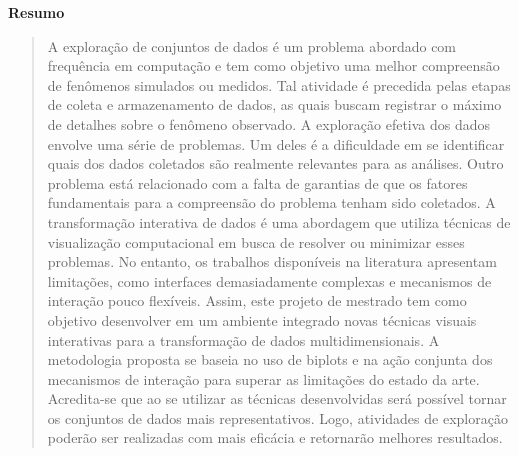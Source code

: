 \begin{center}
  \textbf{Resumo}
\end{center}

\begin{quotation}
\noindent
%
A exploração de conjuntos de dados é um problema abordado
com frequência em computação e tem como objetivo uma melhor
compreensão de fenômenos simulados ou medidos.
%
Tal atividade é precedida pelas etapas de coleta e
armazenamento de dados, as quais buscam registrar o máximo
de detalhes sobre o fenômeno observado.
%
A exploração efetiva dos dados envolve uma série de
problemas. 
%
Um deles é a dificuldade em se identificar quais
dos dados coletados são realmente relevantes para as
análises. 
%
Outro problema está relacionado com a falta de
garantias de que os fatores fundamentais para a compreensão
do problema tenham sido coletados.
% 
A transformação interativa de dados é uma abordagem que
utiliza técnicas de visualização computacional em busca de
resolver ou minimizar esses problemas. 
%
No entanto, os trabalhos disponíveis na literatura
apresentam limitações, como interfaces demasiadamente
complexas e mecanismos de interação pouco flexíveis. 
%
Assim, este projeto de mestrado tem como objetivo
desenvolver em um ambiente integrado novas técnicas visuais
interativas para a transformação de dados multidimensionais.
%
A metodologia proposta se baseia no uso de biplots e na
ação conjunta dos mecanismos de interação para superar as
limitações do estado da arte.
%
Acredita-se que ao se utilizar as técnicas desenvolvidas
será possível tornar os conjuntos de dados mais
representativos. 
%
Logo, atividades de exploração poderão ser
realizadas com mais eficácia e retornarão melhores
resultados.

\end{quotation}

\clearpage
